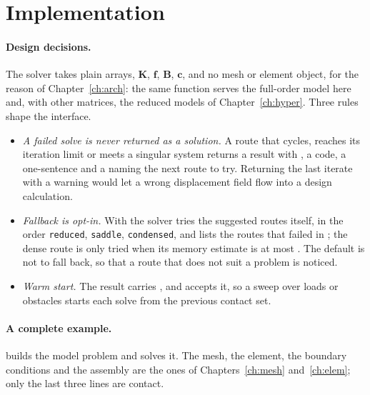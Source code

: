 \section{Implementation}\label{sec:ct-impl}

\paragraph{Design decisions.}
The solver takes plain arrays, $\bm K$, $\bm f$, $\bm B$, $\bm c$, and no mesh or element object, for the reason of Chapter~\ref{ch:arch}: the same function serves the full-order model here and, with other matrices, the reduced models of Chapter~\ref{ch:hyper}. Three rules shape the interface.
\begin{itemize}
\item \emph{A failed solve is never returned as a solution.} A route that cycles, reaches its iteration limit or meets a singular system returns a result with , a  code, a one-sentence  and a  naming the next route to try. Returning the last iterate with a warning would let a wrong displacement field flow into a design calculation.
\item \emph{Fallback is opt-in.} With  the solver tries the suggested routes itself, in the order \texttt{reduced}, \texttt{saddle}, \texttt{condensed}, and lists the routes that failed in ; the dense route is only tried when its memory estimate is at most . The default is not to fall back, so that a route that does not suit a problem is noticed.
\item \emph{Warm start.} The result carries , and  accepts it, so a sweep over loads or obstacles starts each solve from the previous contact set.
\end{itemize}

\paragraph{A complete example.}
 builds the model problem and solves it. The mesh, the element, the boundary conditions and the assembly are the ones of Chapters~\ref{ch:mesh} and~\ref{ch:elem}; only the last three lines are contact.


